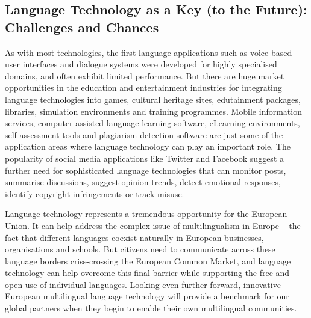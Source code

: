 \begin{multicols}{2}

\subsection{Language Technology as a Key (to the Future): Challenges and Chances }
\label{sec:lang-techn-as-a-key-to-the-future}


As with most technologies, the first language applications such as voice-based user interfaces and dialogue systems were developed for highly specialised domains, and often exhibit limited performance. But there are huge market opportunities in the education and entertainment industries for integrating language technologies into games, cultural heritage sites, edutainment packages, libraries, simulation environments and training programmes. Mobile information services, computer-assisted language learning software, eLearning environments, self-assessment tools and plagiarism detection software are just some of the application areas where language technology can play an important role. The popularity of social media applications like Twitter and Facebook suggest a further need for sophisticated language technologies that can monitor posts, summarise discussions, suggest opinion trends, detect emotional responses, identify copyright infringements or track misuse.

Language technology represents a tremendous opportunity for the European Union. It can help address the complex issue of multilingualism in Europe – the fact that different languages coexist naturally in European businesses, organisations and schools. But citizens need to communicate across these language borders criss-crossing the European Common Market, and language technology can help overcome this final barrier while supporting the free and open use of individual languages. Looking even further forward, innovative European multilingual language technology will provide a benchmark for our global partners when they begin to enable their own multilingual communities. 


\end{multicols}
